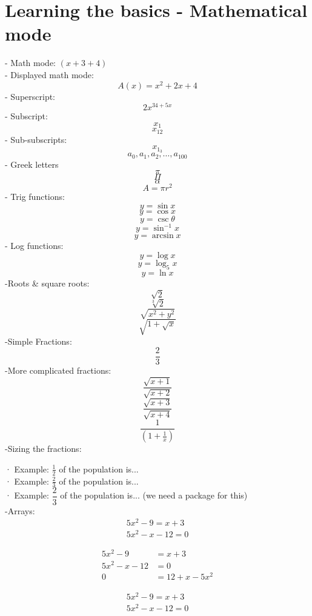 \maketitle
\section{Learning the basics - Mathematical mode}
- Math mode: 
$(x+3+4)$ \\
- Displayed math mode: %
$$A(x)=x^2+2x+4$$
- Superscript: 
$$ 2x^{34+5x}$$
- Subscript: 
$$x_1$$
$$x_{12}$$
- Sub-subscripts:
$$x_{1_3}$$
$$a_0, a_1, a_2, \ldots, a_{100}$$
- Greek letters
$$\pi$$
$$\Pi$$
$$\alpha$$
$$A=\pi r^2$$
- Trig functions:
$$y=\sin x$$
$$y=\cos x$$
$$y=\csc \theta$$
$$y=\sin^{-1} x$$
$$y=\arcsin x$$
- Log functions:
$$y=\log x$$
$$y=\log_5 x$$
$$y=\ln x$$
-Roots \& square roots:
$$\sqrt{2}$$
$$\sqrt[3]{2}$$
$$\sqrt{x^2+y^2}$$
$$\sqrt{   1+\sqrt{x}     }$$
-Simple Fractions:
$$\frac{2}{3}$$
-More complicated fractions: 
$$\frac{\sqrt{x+1}}{\sqrt{x+2}}$$
$$\frac{\sqrt{x+3}}{\sqrt{x+4}}$$
$$\frac{1}{      (1+\frac{1}{x})       }$$
-Sizing the fractions:

· Example: $\displaystyle \frac{1}{2}$ of the population is...\\[10pt]%

· Example: $\frac{2}{3}$ of the population is...\\[10pt]

· Example: $\dfrac{2}{3}$ of the population is... (we need a package for this)\\
-Arrays:
\begin{align}
5x^2-9=x+3\\
5x^2-x-12=0
\end{align}

\begin{align*}  
5x^2-9&=x+3\\
5x^2-x-12&=0\\
0&=12+x-5x^2
\end{align*}

\begin{align}
5x^2-9=x+3\\
5x^2-x-12=0
\end{align}
